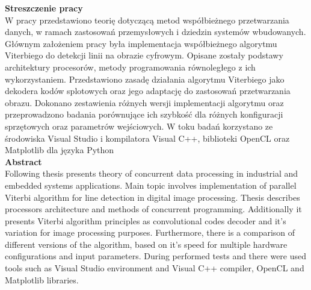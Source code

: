 \documentclass[document.tex]{subfiles}
\begin{document}
\clearpage
\begin{flushleft}
\textbf{\Huge{Streszczenie pracy}}
\vspace{1cm}
\\
W pracy przedstawiono teorię dotyczącą metod współbieżnego przetwarzania danych,
w ramach zastosowań przemysłowych i dziedzin systemów wbudowanych. Głównym założeniem pracy
była implementacja współbieżnego algorytmu Viterbiego do detekcji linii na obrazie cyfrowym.
Opisane zostały podstawy architektury procesorów, metody programowania równoległego
z ich wykorzystaniem. Przedstawiono zasadę działania algorytmu Viterbiego jako dekodera kodów splotowych
oraz jego adaptację do zastosowań przetwarzania obrazu. Dokonano zestawienia różnych wersji implementacji 
algorytmu oraz przeprowadzono badania porównujące ich szybkość dla różnych konfiguracji sprzętowych 
oraz parametrów wejściowych. W toku badań korzystano ze środowiska Visual Studio i kompilatora Visual C++, 
biblioteki OpenCL oraz Matplotlib dla języka Python
\\
\vspace{1cm}
\textbf{\Huge{Abstract}}
\vspace{1cm}
\\
Following thesis presents theory of concurrent data processing in industrial and embedded systems applications.
Main topic involves implementation of parallel Viterbi algorithm for line detection in digital image processing.
Thesis describes processors architecture and methods of concurrent programming. Additionally it presents Viterbi algorithm
principles as convolutional codes decoder and it's variation for image processing purposes. Furthermore, there is
a comparison of different versions of the algorithm, based on it's speed for multiple hardware configurations and input
parameters. During performed tests and there were used tools such as Visual Studio environment and Visual C++ compiler,
OpenCL and Matplotlib libraries.
\end{flushleft}
\clearpage
\end{document}
